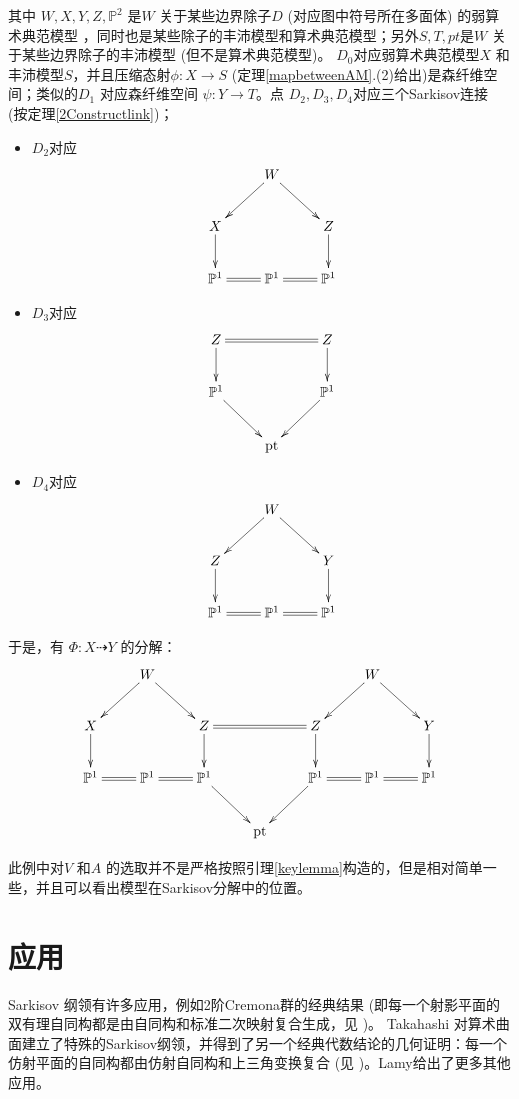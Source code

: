 其中 $ W,X,Y,Z,\mathbb{P}^{2}$ 是$W$ 关于某些边界除子$D$ (对应图中符号所在多面体) 的弱算术典范模型 ，同时也是某些除子的丰沛模型和算术典范模型；另外$S,T,pt $是$W$ 关于某些边界除子的丰沛模型 (但不是算术典范模型)。   
$D_{0}$对应弱算术典范模型$X$ 和丰沛模型$S$，并且压缩态射$\phi:X\to S$ (定理\ref{mapbetweenAM}.(2)给出)是森纤维空间；类似的$D_{1}$ 对应森纤维空间 $\psi:Y\to T$。点 $D_{2},D_{3},D_{4}$对应三个Sarkisov连接 (按定理\ref{2Constructlink})；
\begin{itemize}
  \item $D_{2}$对应
\[ \xymatrix{
                         & W\ar[ld]\ar[rd]          & \\
    X\ar[d]              &                          & Z\ar[d]\\
\mathbb{P}^{1}\ar@{=}[r] & \mathbb{P}^{1}\ar@{=}[r] & \mathbb{P}^{1} } \]
  \item $D_{3}$对应
\[ \xymatrix{
    Z\ar[d]\ar@{=}[rr]    &           & Z\ar[d] \\
    \mathbb{P}^{1}\ar[dr] &           & \mathbb{P}^{1}\ar[dl] \\
                          & \text{pt} & } \]
  \item $D_{4}$对应
\[ \xymatrix{
                         & W\ar[ld]\ar[rd]          & \\
    Z\ar[d]              &                          & Y\ar[d]\\
\mathbb{P}^{1}\ar@{=}[r] & \mathbb{P}^{1}\ar@{=}[r] & \mathbb{P}^{1} } \]
\end{itemize}

于是，有 $\Phi: X\dashrightarrow  Y$ 的分解：
\[ \xymatrix{
                                   & W\ar[ld]\ar[rd]          &                       &           &                                 & W\ar[ld]\ar[rd] \\
    X\ar[d]                        &                          & Z\ar[d]\ar@{=}[rr]    &           & Z\ar[d]                         &                           & Y\ar[d]\\
    \mathbb{P}^{1}\ar@{=}[r]       & \mathbb{P}^{1}\ar@{=}[r] & \mathbb{P}^{1}\ar[dr] &           & \mathbb{P}^{1}\ar[dl]\ar@{=}[r] & \mathbb{P}^{1}\ar@{=}[r] & \mathbb{P}^{1} \\
                                   &                          &                       & \text{pt} &                                 &                           & }\]
\begin{remark}
此例中对$V$ 和$A$ 的选取并不是严格按照引理\ref{keylemma}构造的，但是相对简单一些，并且可以看出模型在Sarkisov分解中的位置。
\end{remark}

\section{应用}

Sarkisov 纲领有许多应用，例如2阶Cremona群的经典结果 (即每一个射影平面的双有理自同构都是由自同构和标准二次映射复合生成，见 \cite[Chapter 2]{ksc04} )。 Takahashi \cite{tak95} 对算术曲面建立了特殊的Sarkisov纲领，并得到了另一个经典代数结论的几何证明：每一个仿射平面的自同构都由仿射自同构和上三角变换复合 (见 \cite[Chpter 13]{mat02})。Lamy\cite{lam22}给出了更多其他应用。

